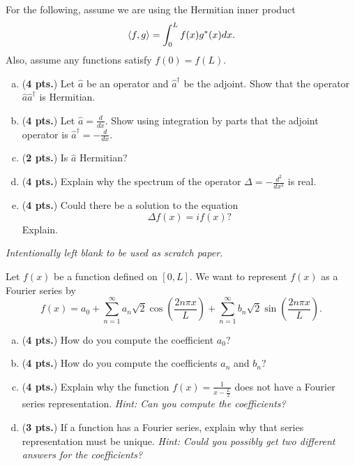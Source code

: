 \documentclass[12pt]{amsbook}
\begin{document}
\newpage
\begin{problem}
For the following, assume we are using the Hermitian inner product
\[
\left\langle f, g\right\rangle = \int_0^L f(x)g^*(x)dx.
\]
Also, assume any functions satisfy $f(0)=f(L)$.
\begin{enumerate}[(a)]
	\item (\textbf{4 pts.}) Let $\hat{a}$ be an operator and $\hat{a}^\dagger$ be the adjoint. Show that the operator $\hat{a}\hat{a}^\dagger$ is Hermitian.
	\vspace*{3cm}
	
	\item (\textbf{4 pts.}) Let $\hat{a} = \frac{d}{dx}$. Show using integration by parts that the adjoint operator is $\hat{a}^\dagger  = -\frac{d}{dx}$.
	\vspace*{4cm}
	
	\item (\textbf{2 pts.}) Is $\hat{a}$ Hermitian?
	\vspace*{3cm}
	
	\item (\textbf{4 pts.}) Explain why the spectrum of the operator $\Delta = - \frac{d^2}{dx^2}$ is real.
	\vspace*{3cm}
	
	\item (\textbf{4 pts.}) Could there be a solution to the equation
	\[
	\Delta f(x) = i f(x)?
	\]
	Explain.
\end{enumerate}
\end{problem}

\newpage
\emph{Intentionally left blank to be used as scratch paper.}\\


\newpage
\begin{problem} Let $f(x)$ be a function defined on $[0,L]$.  We want to represent $f(x)$ as a Fourier series by
\[
f(x) = a_0 + \sum_{n=1}^\infty a_n \sqrt{2} \cos\left(\frac{2n \pi x}{L}\right) + \sum_{n=1}^\infty b_n \sqrt{2} \sin\left(\frac{2n\pi x}{L}\right).
\]
\begin{enumerate}[(a)]
	\item (\textbf{4 pts.}) How do you compute the coefficient $a_0$?
	\vspace*{4cm}
	
	\item (\textbf{4 pts.}) How do you compute the coefficients $a_n$ and $b_n$?
	\vspace*{4cm}
	
	\item (\textbf{4 pts.}) Explain why the function $f(x) = \frac{1}{x-\frac{L}{2}}$ does not have a Fourier series representation. \emph{Hint: Can you compute the coefficients?}
	\vspace*{4cm}
	
	\item (\textbf{3 pts.}) If a function has a Fourier series, explain why that series representation must be unique. \emph{Hint: Could you possibly get two different answers for the coefficients?}
\end{enumerate}
\end{problem}
\end{document}
